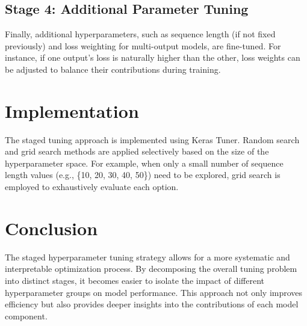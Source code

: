 \subsection{Stage 4: Additional Parameter Tuning}
Finally, additional hyperparameters, such as sequence length (if not fixed previously) and loss weighting for multi-output models, are fine-tuned. For instance, if one output's loss is naturally higher than the other, loss weights can be adjusted to balance their contributions during training.

\section{Implementation}
The staged tuning approach is implemented using Keras Tuner. Random search and grid search methods are applied selectively based on the size of the hyperparameter space. For example, when only a small number of sequence length values (e.g., \{10, 20, 30, 40, 50\}) need to be explored, grid search is employed to exhaustively evaluate each option.

\section{Conclusion}
The staged hyperparameter tuning strategy allows for a more systematic and interpretable optimization process. By decomposing the overall tuning problem into distinct stages, it becomes easier to isolate the impact of different hyperparameter groups on model performance. This approach not only improves efficiency but also provides deeper insights into the contributions of each model component.





